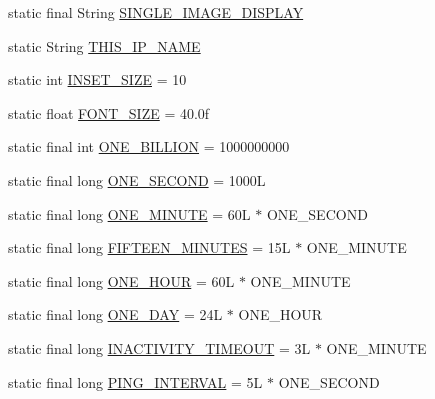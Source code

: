 \begin{DoxyCompactItemize}
\item 
static final String \hyperlink{classgov_1_1fnal_1_1ppd_1_1dd_1_1GlobalVariables_ab018dd06fadda0d1bc99e7de66894e84}{S\-I\-N\-G\-L\-E\-\_\-\-I\-M\-A\-G\-E\-\_\-\-D\-I\-S\-P\-L\-A\-Y}
\item 
static String \hyperlink{classgov_1_1fnal_1_1ppd_1_1dd_1_1GlobalVariables_a35adf140ccbaaf275e34d1539424828a}{T\-H\-I\-S\-\_\-\-I\-P\-\_\-\-N\-A\-M\-E}
\item 
static int \hyperlink{classgov_1_1fnal_1_1ppd_1_1dd_1_1GlobalVariables_a938952f27836544cbcf8eed0fceecb99}{I\-N\-S\-E\-T\-\_\-\-S\-I\-Z\-E} = 10
\item 
static float \hyperlink{classgov_1_1fnal_1_1ppd_1_1dd_1_1GlobalVariables_a9331af89f789ea1b54581c0198f7a43d}{F\-O\-N\-T\-\_\-\-S\-I\-Z\-E} = 40.\-0f
\item 
static final int \hyperlink{classgov_1_1fnal_1_1ppd_1_1dd_1_1GlobalVariables_a271c983add4bac415412025c8ac2f4cc}{O\-N\-E\-\_\-\-B\-I\-L\-L\-I\-O\-N} = 1000000000
\item 
static final long \hyperlink{classgov_1_1fnal_1_1ppd_1_1dd_1_1GlobalVariables_a3718d8133f257fcc337f5131c8e22d48}{O\-N\-E\-\_\-\-S\-E\-C\-O\-N\-D} = 1000\-L
\item 
static final long \hyperlink{classgov_1_1fnal_1_1ppd_1_1dd_1_1GlobalVariables_a79fc1e35198b44168537a85aa4c2d942}{O\-N\-E\-\_\-\-M\-I\-N\-U\-T\-E} = 60\-L $\ast$ O\-N\-E\-\_\-\-S\-E\-C\-O\-N\-D
\item 
static final long \hyperlink{classgov_1_1fnal_1_1ppd_1_1dd_1_1GlobalVariables_ae09d2d42603daf3b4d5fccd1c489a93b}{F\-I\-F\-T\-E\-E\-N\-\_\-\-M\-I\-N\-U\-T\-E\-S} = 15\-L $\ast$ O\-N\-E\-\_\-\-M\-I\-N\-U\-T\-E
\item 
static final long \hyperlink{classgov_1_1fnal_1_1ppd_1_1dd_1_1GlobalVariables_a947f75994e24bb52604adf3699920579}{O\-N\-E\-\_\-\-H\-O\-U\-R} = 60\-L $\ast$ O\-N\-E\-\_\-\-M\-I\-N\-U\-T\-E
\item 
static final long \hyperlink{classgov_1_1fnal_1_1ppd_1_1dd_1_1GlobalVariables_aef5cbdf53c9830ae609987b805a08998}{O\-N\-E\-\_\-\-D\-A\-Y} = 24\-L $\ast$ O\-N\-E\-\_\-\-H\-O\-U\-R
\item 
static final long \hyperlink{classgov_1_1fnal_1_1ppd_1_1dd_1_1GlobalVariables_ab33d116e6a83d46d778ee5c3521a39a4}{I\-N\-A\-C\-T\-I\-V\-I\-T\-Y\-\_\-\-T\-I\-M\-E\-O\-U\-T} = 3\-L $\ast$ O\-N\-E\-\_\-\-M\-I\-N\-U\-T\-E
\item 
static final long \hyperlink{classgov_1_1fnal_1_1ppd_1_1dd_1_1GlobalVariables_ac2e535e1d551e5eae9749ad1ff4eeccf}{P\-I\-N\-G\-\_\-\-I\-N\-T\-E\-R\-V\-A\-L} = 5\-L $\ast$ O\-N\-E\-\_\-\-S\-E\-C\-O\-N\-D

\end{DoxyCompactItemize}
